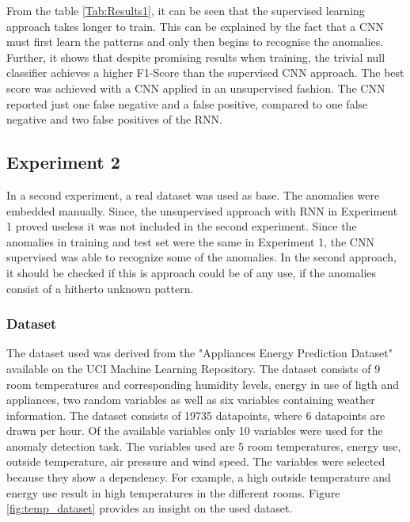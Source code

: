 From the table \ref{Tab:Results1}, it can be seen that the supervised learning approach takes longer to train. This can be explained by the fact that a CNN must first learn the patterns and only then begins to recognise the anomalies. Further, it shows that despite promising results when training, the trivial null classifier achieves a higher F1-Score than the supervised CNN approach. 
The best score was achieved with a CNN applied in an unsupervised fashion. The CNN reported just one false negative and a false positive, compared to one false negative and two false positives of the RNN.

\newpage

\subsection{Experiment 2}
In a second experiment, a real dataset was used as base. The anomalies were embedded manually. Since, the unsupervised approach with RNN in Experiment 1 proved useless it was not included in the second experiment. Since the anomalies in training and test set were the same in Experiment 1, the CNN supervised was able to recognize some of the anomalies. In the second approach, it should be checked if this is approach could be of any use, if the anomalies consist of a hitherto unknown pattern.

\subsubsection{Dataset}
The dataset used was derived from the "Appliances Energy Prediction Dataset" available on the UCI Machine Learning Repository. The dataset consists of 9 room temperatures and corresponding humidity levels, energy in use of ligth and appliances, two random variables as well as six variables containing weather information. The dataset consists of 19735 datapoints, where 6 datapoints are drawn per hour. Of the available variables only 10 variables were used for the anomaly detection task. The variables used are 5 room temperatures, energy use, outside temperature, air pressure and wind speed. The variables were selected because they show a dependency. For example, a high outside temperature and energy use result in high temperatures in the different rooms. Figure \ref{fig:temp_dataset} provides an insight on the used dataset. 

